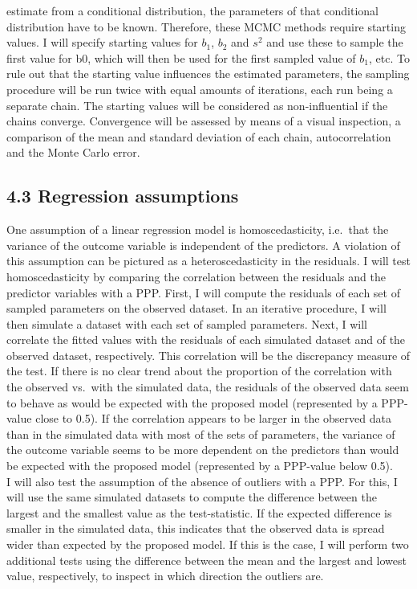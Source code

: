 \documentclass[
]{article}
\begin{document}
estimate from a conditional distribution, the parameters of that
conditional distribution have to be known. Therefore, these MCMC methods
require starting values. I will specify starting values for \(b_1\),
\(b_2\) and \(s^2\) and use these to sample the first value for b0,
which will then be used for the first sampled value of \(b_1\), etc. To
rule out that the starting value influences the estimated parameters,
the sampling procedure will be run twice with equal amounts of
iterations, each run being a separate chain. The starting values will be
considered as non-influential if the chains converge. Convergence will
be assessed by means of a visual inspection, a comparison of the mean
and standard deviation of each chain, autocorrelation and the Monte
Carlo error.

\hypertarget{regression-assumptions}{%
\subsection{4.3 Regression assumptions}\label{regression-assumptions}}

One assumption of a linear regression model is homoscedasticity,
i.e.~that the variance of the outcome variable is independent of the
predictors. A violation of this assumption can be pictured as a
heteroscedasticity in the residuals. I will test homoscedasticity by
comparing the correlation between the residuals and the predictor
variables with a PPP. First, I will compute the residuals of each set of
sampled parameters on the observed dataset. In an iterative procedure, I
will then simulate a dataset with each set of sampled parameters. Next,
I will correlate the fitted values with the residuals of each simulated
dataset and of the observed dataset, respectively. This correlation will
be the discrepancy measure of the test. If there is no clear trend about
the proportion of the correlation with the observed vs.~with the
simulated data, the residuals of the observed data seem to behave as
would be expected with the proposed model (represented by a PPP-value
close to 0.5). If the correlation appears to be larger in the observed
data than in the simulated data with most of the sets of parameters, the
variance of the outcome variable seems to be more dependent on the
predictors than would be expected with the proposed model (represented
by a PPP-value below 0.5).\\
I will also test the assumption of the absence of outliers with a PPP.
For this, I will use the same simulated datasets to compute the
difference between the largest and the smallest value as the
test-statistic. If the expected difference is smaller in the simulated
data, this indicates that the observed data is spread wider than
expected by the proposed model. If this is the case, I will perform two
additional tests using the difference between the mean and the largest
and lowest value, respectively, to inspect in which direction the
outliers are.
\end{document}
